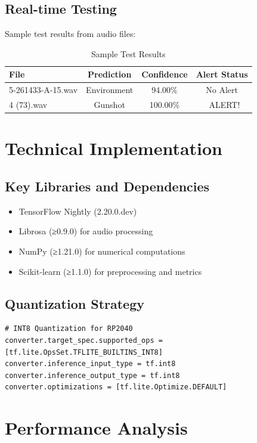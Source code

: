 \documentclass[12pt]{article}
\begin{document}
\subsection{Real-time Testing}
Sample test results from audio files:

\begin{table}[H]
\centering
\caption{Sample Test Results}
\begin{tabular}{@{}lccc@{}}
\toprule
\textbf{File} & \textbf{Prediction} & \textbf{Confidence} & \textbf{Alert Status} \\
\midrule
5-261433-A-15.wav & Environment & 94.00\% & No Alert \\
4 (73).wav & Gunshot & 100.00\% & 🚨 ALERT! \\
\bottomrule
\end{tabular}
\end{table}

\section{Technical Implementation}

\subsection{Key Libraries and Dependencies}
\begin{itemize}
    \item TensorFlow Nightly (2.20.0.dev)
    \item Librosa (≥0.9.0) for audio processing
    \item NumPy (≥1.21.0) for numerical computations
    \item Scikit-learn (≥1.1.0) for preprocessing and metrics
\end{itemize}

\subsection{Quantization Strategy}
\begin{lstlisting}[caption={TensorFlow Lite Quantization Configuration}]
# INT8 Quantization for RP2040
converter.target_spec.supported_ops = [tf.lite.OpsSet.TFLITE_BUILTINS_INT8]
converter.inference_input_type = tf.int8
converter.inference_output_type = tf.int8
converter.optimizations = [tf.lite.Optimize.DEFAULT]
\end{lstlisting}

\section{Performance Analysis}
\end{document}
